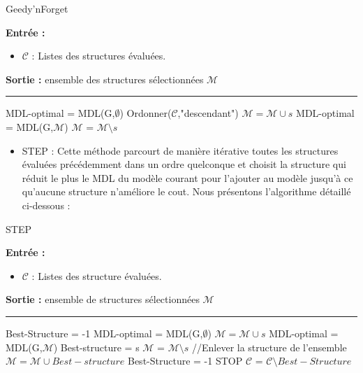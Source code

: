\documentclass[a4paper,oneside,12pt]{report}
\theoremstyle{definition}
\begin{document}
\begin{algorithm}[H]
\label{alg:GNF}
	\caption{Geedy'nForget}
		\textbf{Entrée :}
		\begin{itemize}[label=$\bullet$]
			\item $\mathcal{C}$ : Listes des structures évaluées.
							
							
			\end{itemize}
	\textbf{Sortie :} ensemble des structures sélectionnées $\mathcal{M}$\\							\noindent\rule{\textwidth}{1pt}
								
	\begin{algorithmic} [1]
	 \STATE MDL-optimal = MDL(G,$\emptyset$)
\STATE Ordonner($\mathcal{C}$,"descendant") 
	\STATE $\mathcal{M} = \mathcal{M} \cup {s}$ 
			\STATE MDL-optimal = MDL(G,$\mathcal{M}$)
		\ELSE 
			\STATE $\mathcal{M}$ = $\mathcal{M} \setminus {s}$  
		\ENDIF
	\ENDFOR   
	\end{algorithmic}
		\end{algorithm}

\begin{itemize}
\item STEP : Cette méthode parcourt de manière itérative toutes les structures évaluées précédemment dans un ordre quelconque et choisit la structure qui réduit le plus le MDL du modèle courant pour l'ajouter au modèle jusqu'à ce qu'aucune structure n'améliore le cout. Nous présentons l'algorithme détaillé ci-dessous :


\end{itemize}

\begin{algorithm}[H]
\label{alg:STEP}
	\caption{STEP}
		\textbf{Entrée :}
		\begin{itemize}[label=$\bullet$]
			\item $\mathcal{C}$ : Listes des structure évaluées.
							
							
			\end{itemize}
	\textbf{Sortie :} ensemble de structures sélectionnées $\mathcal{M}$\\							\noindent\rule{\textwidth}{1pt}
								
	\begin{algorithmic} [1]
	\STATE Best-Structure = -1
	 \STATE MDL-optimal = MDL(G,$\emptyset$)
	\STATE $\mathcal{M} = \mathcal{M} \cup {s}$ 
			\STATE MDL-optimal = MDL(G,$\mathcal{M}$)
			\STATE Best-structure = s
		\ENDIF
		\STATE $\mathcal{M}$ = $\mathcal{M} \setminus {s}$  //Enlever la structure de l'ensemble
	\ENDFOR
	   \STATE $\mathcal{M} = \mathcal{M} \cup {Best-structure}$ 
	   \STATE Best-Structure = -1
	   \ELSE 
	   \STATE STOP
	  \ENDIF
		\STATE $\mathcal{C}$ = $\mathcal{C} \setminus {Best-Structure}$
	\ENDWHILE
	\end{algorithmic}
		\end{algorithm}
		
\end{document}
